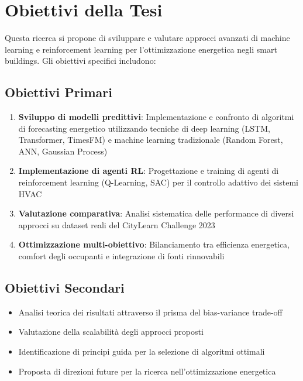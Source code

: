 \documentclass[12pt,a4paper,twoside]{report}
\begin{document}
\section{Obiettivi della Tesi}

Questa ricerca si propone di sviluppare e valutare approcci avanzati di machine learning e reinforcement learning per l'ottimizzazione energetica negli smart buildings. Gli obiettivi specifici includono:

\subsection{Obiettivi Primari}

\begin{enumerate}
    \item \textbf{Sviluppo di modelli predittivi}: Implementazione e confronto di algoritmi di forecasting energetico utilizzando tecniche di deep learning (LSTM, Transformer, TimesFM) e machine learning tradizionale (Random Forest, ANN, Gaussian Process)
    
    \item \textbf{Implementazione di agenti RL}: Progettazione e training di agenti di reinforcement learning (Q-Learning, SAC) per il controllo adattivo dei sistemi HVAC
    
    \item \textbf{Valutazione comparativa}: Analisi sistematica delle performance di diversi approcci su dataset reali del CityLearn Challenge 2023
    
    \item \textbf{Ottimizzazione multi-obiettivo}: Bilanciamento tra efficienza energetica, comfort degli occupanti e integrazione di fonti rinnovabili
\end{enumerate}

\subsection{Obiettivi Secondari}

\begin{itemize}
    \item Analisi teorica dei risultati attraverso il prisma del bias-variance trade-off
    \item Valutazione della scalabilità degli approcci proposti
    \item Identificazione di principi guida per la selezione di algoritmi ottimali
    \item Proposta di direzioni future per la ricerca nell'ottimizzazione energetica
\end{itemize}
\end{document}
